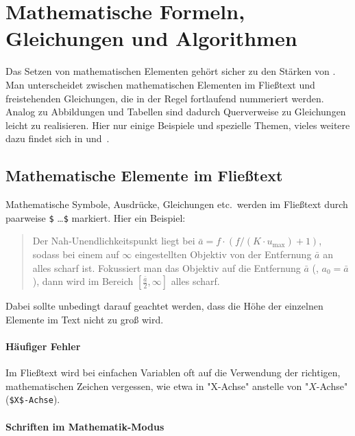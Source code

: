 \chapter[Mathem.\ Formeln etc.]{Mathematische Formeln, Gleichungen und Algorithmen}
\label{cha:Mathematik}

Das Setzen von mathematischen Elementen gehört sicher zu den Stär\-ken
von \latex. Man unterscheidet zwischen mathematischen Elementen im Fließtext
und freistehenden Gleichungen, die in der Regel fortlaufend nummeriert werden.
Analog zu Abbildungen und Tabellen sind dadurch Querverweise zu Gleichungen
leicht zu realisieren. Hier nur einige Beispiele und spezielle Themen, vieles
weitere dazu findet sich \zB in \cite[Kap.\ 7]{Kopka2003} und~\cite{Voss2014}.


\section{Mathematische Elemente im Fließtext}

Mathematische Symbole, Ausdrücke, Gleichungen etc.\ werden im Fließtext durch
paarweise \verb!$! \ldots \verb!$! markiert. Hier ein Beispiel:
%
\begin{quote}
	Der Nah-Unendlichkeitspunkt liegt bei
	$\bar{a} = f \cdot (f / (K \cdot u_{\max}) + 1)$,
	sodass bei einem auf $\infty$ eingestellten Objektiv von der Entfernung
	$\bar{a}$ an alles scharf ist. Fokussiert man das Objektiv auf die
	Entfernung $\bar{a}$ (\dah, $a_0 = \bar{a}$), dann wird im Bereich
	$[\frac{\bar{a}}{2}, \infty]$ alles scharf.
\end{quote}
%
Dabei sollte unbedingt darauf geachtet werden, dass die Höhe der einzelnen
Elemente im Text nicht zu groß wird.

\subsubsection{Häufiger Fehler}

Im Fließtext wird bei einfachen Variablen oft auf die Verwendung der richtigen,
mathematischen Zeichen vergessen, wie etwa in "X-Achse" anstelle von "$X$-Achse"
(\verb!$X$-Achse!).


\subsubsection{Schriften im Mathematik-Modus}

